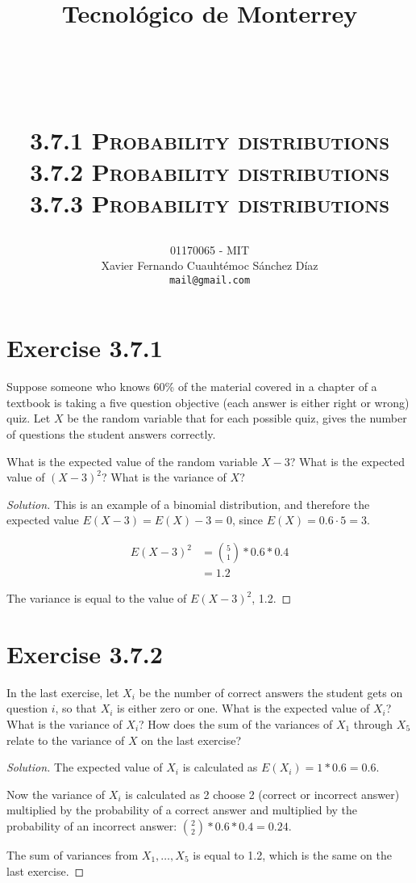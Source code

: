 \documentclass[titlepage, letterpaper, fleqn]{article}
\title{
\vspace{1in}
\textbf{Tecnológico de Monterrey} \\
\vspace{0.5in}
\textmd{\mahclass} \\
\large{\textit{\mahteacher}} \\
\vspace{0.5in}
\textsc{\mahtitle}\\
\textsc{3.7.1 Probability distributions}\\
\textsc{3.7.2 Probability distributions}\\
\textsc{3.7.3 Probability distributions}\\
\author{01170065  - MIT \\
Xavier Fernando Cuauhtémoc Sánchez Díaz \\
\texttt{mail@gmail.com}}
\date{\mahdate}
}
\newcommand{\spacepls}{\vspace{5mm}}
\renewcommand\qedsymbol{\(\blacksquare\)}
\newenvironment{solution}
{\renewcommand\qedsymbol{$\square$}\begin{proof}[Solution]}
{\end{proof}}
\begin{document}
\begin{titlepage}
\maketitle
\end{titlepage}

%
%

\section{Exercise 3.7.1}

{\large Suppose someone who knows 60\% of the material covered in a chapter of a textbook is taking a five question objective (each answer is either right or wrong) quiz.
Let \(X\) be the random variable that for each possible quiz,
gives the number of questions the student answers correctly.

What is the expected value of the random variable \(X - 3\)?
What is the expected value of \((X - 3)^2\)?
What is the variance of \(X\)?}

\begin{solution}
This is an example of a binomial distribution, and therefore the expected value \(E(X - 3) = E(X) - 3 = 0\), since \(E(X) = 0.6 \cdot 5 = 3\).

\begin{align*}
E(X -3)^2 & = \binom{5}{1} * 0.6 * 0.4 \\
& = 1.2
\end{align*}

The variance is equal to the value of \(E(X-3)^2\), 1.2.
\end{solution}

\spacepls

\section{Exercise 3.7.2}

{\large In the last exercise, let \(X_i\) be the number of correct answers the student gets on question \(i\), so that \(X_i\) is either zero or one.
What is the expected value of \(X_i\)?
What is the variance of \(X_i\)?
How does the sum of the variances of \(X_1\) through \(X_5\) relate to the variance of \(X\) on the last exercise?}

\begin{solution}
The expected value of \(X_i\) is calculated as \(E(X_i) = 1 * 0.6 = 0.6\).

Now the variance of \(X_i\) is calculated as 2 choose 2 (correct or incorrect answer) multiplied by the probability of a correct answer and multiplied by the probability of an incorrect answer:
\(\binom{2}{2} * 0.6 * 0.4 = 0.24\).

The sum of variances from \(X_1, \dots , X_5\) is equal to 1.2, which is the same on the last exercise.
\end{solution}
\end{document}

